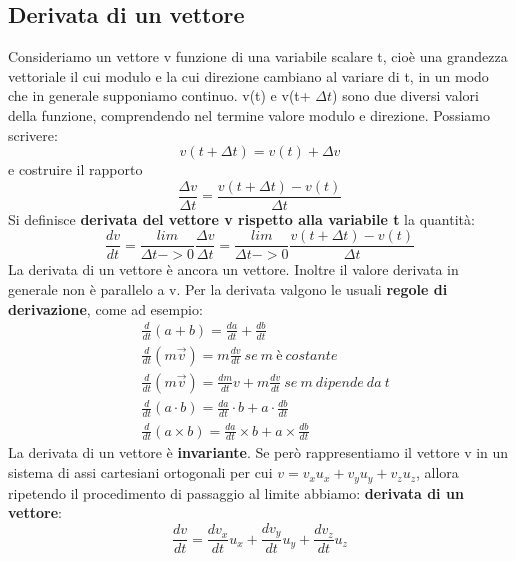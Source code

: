 \documentclass{article}
\numberwithin{equation}{subsection}
\begin{document}
  \subsection{Derivata di un vettore}
  Consideriamo un vettore v funzione di una variabile scalare t, cioè una grandezza vettoriale il cui modulo e la cui direzione cambiano al variare di t, in un modo che in generale supponiamo continuo. v(t) e v(t+ $\Delta t$) sono due diversi valori della funzione, comprendendo nel termine valore modulo e direzione. Possiamo scrivere:
  \begin{equation}
      v(t+ \Delta t) = v(t) + \Delta v
  \end{equation}
  e costruire il rapporto
  \begin{equation}
      \frac{\Delta v
      }{\Delta t} = \frac{v(t + \Delta t)- v(t)}{\Delta t}
  \end{equation}
  Si definisce \textbf{derivata del vettore v rispetto alla variabile t} la quantità:
  \begin{equation}
      \frac{dv}{dt}= \frac{lim}{\Delta t -> 0}\frac{\Delta v}{\Delta t}=\frac{lim}{\Delta t -> 0} \frac{v(t+ \Delta t) - v(t)}{\Delta t}
  \end{equation}
  La derivata di un vettore è ancora un vettore. Inoltre il valore derivata in generale non è parallelo a v. Per la derivata valgono le usuali \textbf{regole di derivazione}, come ad esempio:
  \begin{align}
      & \frac{d}{dt}(a + b) = \frac{da}{dt}+\frac{db}{dt} \\
      & \frac{d}{dt}(m\vec{v}) = m\frac{dv}{dt} \ se \ m \ \text{è} \ costante\\
      &\frac{d}{dt}(m\vec{v}) = \frac{dm}{dt}v+m\frac{dv}{dt} \ se \ m \ dipende \ da \ t \\
      & \frac{d}{dt}(a \cdot b) = \frac{da}{dt} \cdot b + a \cdot \frac{db}{dt} \\
      & \frac{d}{dt}(a \times b) = \frac{da}{dt} \times b + a \times \frac{db}{dt} 
  \end{align}
La derivata di un vettore è \textbf{invariante}. Se però rappresentiamo il vettore v in un sistema di assi cartesiani ortogonali per cui $v=v_xu_x+v_yu_y+v_zu_z$, allora ripetendo il procedimento di passaggio al limite abbiamo: \textbf{derivata di un vettore}:
\begin{equation}
    \frac{dv}{dt}=\frac{dv_x}{dt}u_x + \frac{dv_y}{dt}u_y + \frac{dv_z}{dt}u_z
\end{equation}
\end{document}
